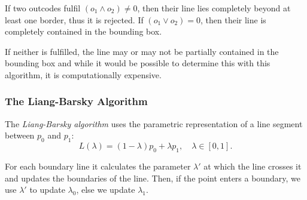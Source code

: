 \documentclass{panikzettel}
\begin{document}
If two outcodes fulfil $(o_1 \land o_2) \neq 0$, then their line lies completely beyond at least one border, thus it is rejected. If $(o_1 \lor o_2) = 0$, then their line is completely contained in the bounding box.

If neither is fulfilled, the line may or may not be partially contained in the bounding box and while it would be possible to determine this with this algorithm, it is computationally expensive.

\subsubsection*{The Liang-Barsky Algorithm}

\begin{halfboxl}
The \emph{Liang-Barsky algorithm} uses the parametric representation of a line segment between $p_0$ and $p_1$: $$L(\lambda) = (1 - \lambda)p_0 + \lambda p_1, \quad \lambda \in [0,1].$$

For each boundary line it calculates the parameter $\lambda'$ at which the line crosses it and updates the boundaries of the line. Then, if the point enters a boundary, we use $\lambda'$ to update $\lambda_0$, else we update $\lambda_1$.
\end{halfboxl}%
\begin{halfboxr}
\vspace{-\baselineskip}
\begin{center}
\end{center}
\end{halfboxr}
\end{document}
